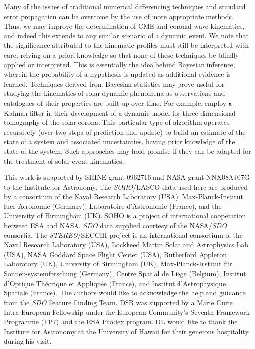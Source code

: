 \documentclass[structabstract]{aa}
\begin{document}
Many of the issues of traditional numerical differencing techniques and standard error propagation can be overcome by the use of more appropriate methods. Thus, we may improve the determination of CME and coronal wave kinematics, and indeed this extends to any similar scenario of a dynamic event. We note that the significance attributed to the kinematic profiles must still be interpreted with care, relying on a priori knowledge so that none of these techniques be blindly applied or interpreted. This is essentially the idea behind Bayesian inference, wherein the probability of a hypothesis is updated as additional evidence is learned. Techniques derived from Bayesian statistics may prove useful for studying the kinematics of solar dynamic phenomena as observations and catalogues of their properties are built-up over time. For example, \citet{2010SoPh..262..495B} employ a Kalman filter in their development of a dynamic model for three-dimensional tomography of the solar corona. This particular type of algorithm operates recursively (over two steps of prediction and update) to build an estimate of the state of a system and associated uncertainties, having prior knowledge of the state of the system. Such approaches may hold promise if they can be adapted for the treatment of solar event kinematics.


\begin{acknowledgements}
This work is supported by SHINE grant 0962716 and NASA grant NNX08AJ07G to the Institute for Astronomy. The \emph{SOHO}/LASCO data used here are produced by a consortium of the Naval Research Laboratory (USA), Max-Planck-Institut fuer Aeronomie (Germany), Laboratoire d'Astronomie (France), and the University of Birmingham (UK). SOHO is a project of international cooperation between ESA and NASA. \emph{SDO} data supplied courtesy of the NASA/\emph{SDO} consortia. The \emph{STEREO}/SECCHI project is an international consortium of the Naval Research Laboratory (USA), Lockheed Martin Solar and Astrophysics Lab (USA), NASA Goddard Space Flight Center (USA), Rutherford Appleton Laboratory (UK), University of Birmingham (UK), Max-Planck-Institut f\"{u}r Sonnen-systemforschung (Germany), Centre Spatial de Liege (Belgium), Institut d'Optique Th\'{e}orique et Appliqu\'{e}e (France), and Institut d'Astrophysique Spatiale (France). The authors would like to acknowledge the help and guidance from the \emph{SDO} Feature Finding Team. DSB was supported by a Marie Curie Intra-European Fellowship under the European Community's Seventh Framework Programme (FP7) and the ESA Prodex program. DL would like to thank the Institute for Astronomy at the University of Hawaii for their generous hospitality during his visit.
\end{acknowledgements}




  
\end{document}
